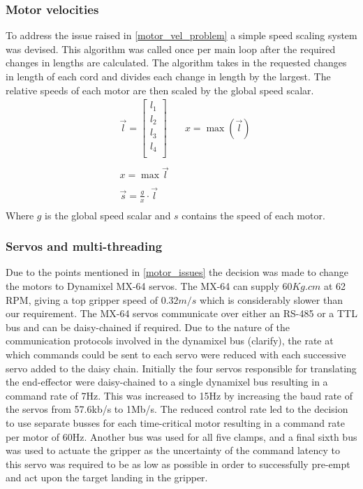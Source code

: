 \documentclass[conference]{IEEEtran}
\begin{document}
	\subsubsection{Motor velocities}\label{motor_speed_section}
	To address the issue raised in \ref{motor_vel_problem} a simple speed scaling system was devised. This algorithm was called once per main loop after the required changes in lengths are calculated. The algorithm takes in the requested changes in length of each cord and divides each change in length by the largest. The relative speeds of each motor are then scaled by the global speed scalar.
	\begin{equation}\label{motor_speed_equation}
	\begin{aligned}
	&\vec{l} = \begin{bmatrix}
	l_1\\l_2\\l_3\\l_4\\
	\end{bmatrix}\quad
	&x = \max\left(\vec{l}\right)\\\\
	&x = \max\vec{l}\\\\
	&\vec{s} = \frac{g}{x}\cdot \vec{l}\\
	\end{aligned}
	\end{equation}
	Where $g$ is the global speed scalar and $s$ contains the speed of each motor. 
	\subsubsection{Servos and multi-threading}
	Due to the points mentioned in \ref{motor_issues} the decision was made to change the motors to Dynamixel MX-64 servos. The MX-64 can supply $60Kg.cm$ at 62 RPM, giving a top gripper speed of $0.32m/s$ which is considerably slower than our requirement. The MX-64 servos communicate over either an RS-485 or a TTL bus and can be daisy-chained if required. Due to the nature of the communication protocols involved in the dynamixel bus (clarify), the rate at which commands could be sent to each servo were reduced with each successive servo added to the daisy chain. Initially the four servos responsible for translating the end-effector were daisy-chained to a single dynamixel bus resulting in a command rate of 7Hz. This was increased to 15Hz by increasing the baud rate of the servos from 57.6kb/s to 1Mb/s. The reduced control rate led to the decision to use separate busses for each time-critical motor resulting in a command rate per motor of 60Hz. Another bus was used for all five clamps, and a final sixth bus was used to actuate the gripper as the uncertainty of the command latency to this servo was required to be as low as possible in order to successfully pre-empt and act upon the target landing in the gripper. 
	
\end{document}
